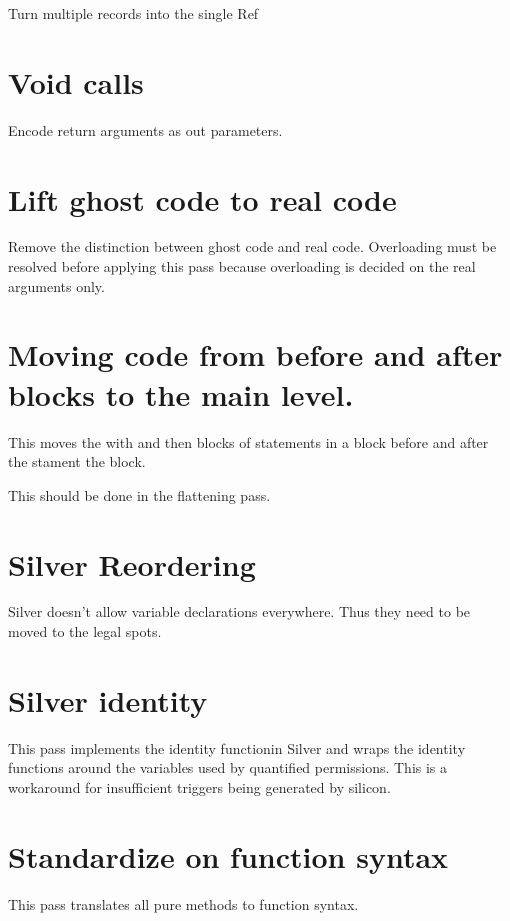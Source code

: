 Turn multiple records into the single Ref

\section{Void calls}

Encode return arguments as out parameters.

\section{Lift ghost code to real code}

Remove the distinction between ghost code and real code.
Overloading must be resolved before applying this pass
because overloading is decided on the real arguments only.

\section{Moving code from before and after blocks to the main level.}

This moves the with and then blocks of statements in a block
before and after the stament the block.

This should be done in the flattening pass.

\section{Silver Reordering}

Silver doesn't allow variable declarations everywhere.
Thus they need to be moved to the legal spots.

\section{Silver identity}

This pass implements the identity functionin Silver and wraps
the identity functions around the variables used by quantified permissions.
This is a workaround for insufficient triggers being generated by
silicon.


\section{Standardize on function syntax}

This pass translates all pure methods to function syntax.

